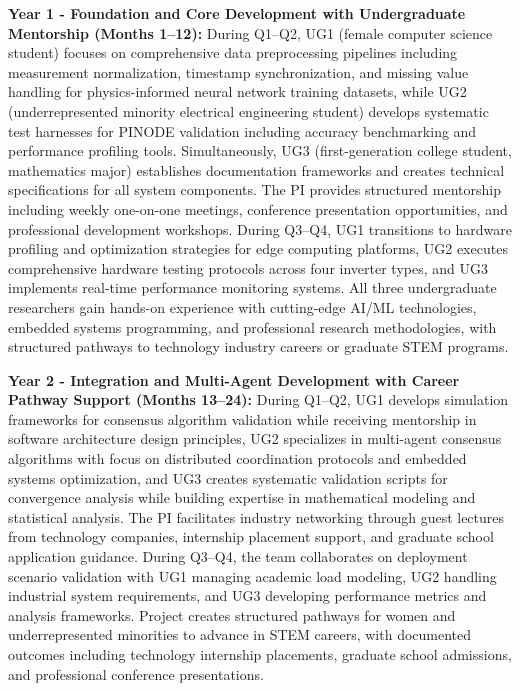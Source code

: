 \documentclass[12pt]{article}
\begin{document}
\textbf{Year 1 - Foundation and Core Development with Undergraduate Mentorship (Months 1--12):} During Q1--Q2, UG1 (female computer science student) focuses on comprehensive data preprocessing pipelines including measurement normalization, timestamp synchronization, and missing value handling for physics-informed neural network training datasets, while UG2 (underrepresented minority electrical engineering student) develops systematic test harnesses for PINODE validation including accuracy benchmarking and performance profiling tools. Simultaneously, UG3 (first-generation college student, mathematics major) establishes documentation frameworks and creates technical specifications for all system components. The PI provides structured mentorship including weekly one-on-one meetings, conference presentation opportunities, and professional development workshops. During Q3--Q4, UG1 transitions to hardware profiling and optimization strategies for edge computing platforms, UG2 executes comprehensive hardware testing protocols across four inverter types, and UG3 implements real-time performance monitoring systems. All three undergraduate researchers gain hands-on experience with cutting-edge AI/ML technologies, embedded systems programming, and professional research methodologies, with structured pathways to technology industry careers or graduate STEM programs.

\textbf{Year 2 - Integration and Multi-Agent Development with Career Pathway Support (Months 13--24):} During Q1--Q2, UG1 develops simulation frameworks for consensus algorithm validation while receiving mentorship in software architecture design principles, UG2 specializes in multi-agent consensus algorithms with focus on distributed coordination protocols and embedded systems optimization, and UG3 creates systematic validation scripts for convergence analysis while building expertise in mathematical modeling and statistical analysis. The PI facilitates industry networking through guest lectures from technology companies, internship placement support, and graduate school application guidance. During Q3--Q4, the team collaborates on deployment scenario validation with UG1 managing academic load modeling, UG2 handling industrial system requirements, and UG3 developing performance metrics and analysis frameworks. Project creates structured pathways for women and underrepresented minorities to advance in STEM careers, with documented outcomes including technology internship placements, graduate school admissions, and professional conference presentations.
\end{document}
